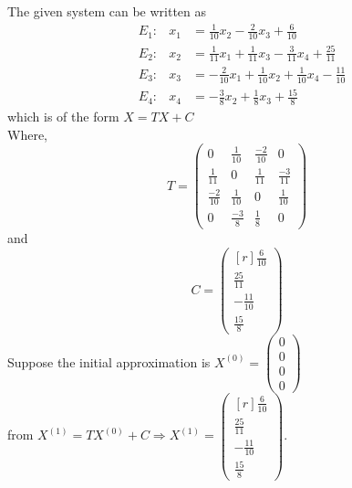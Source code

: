 \documentclass[12pt,class=book,crop=false]{standalone}
\begin{document}
    \begin{soln}
        The given system can be written as
        \[
            \begin{aligned}
                &E_1:&x_1&= \frac{1}{10}x_2-\frac{2}{10}x_3+\frac{6}{10}\\
                &E_2:&x_2&= \frac{1}{11}x_1+\frac{1}{11}x_3-\frac{3}{11}x_4+\frac{25}{11}\\
                &E_3:&x_3&= -\frac{2}{10}x_1+\frac{1}{10}x_2+\frac{1}{10}x_4-\frac{11}{10}\\
                &E_4:&x_4&= -\frac{3}{8}x_2+\frac{1}{8}x_3+\frac{15}{8}
            \end{aligned}
        \]
        which is of the form \( X=TX+C \)\\
        Where,
        \[
            T=\begin{pmatrix}
                0&\frac{1}{10}&\frac{-2}{10}&0\\[.5cm]
                \frac{1}{11}&0&\frac{1}{11}&\frac{-3}{11}\\[.5cm]
                \frac{-2}{10}&\frac{1}{10}&0&\frac{1}{10}\\[.5cm]
                0&\frac{-3}{8}&\frac{1}{8}&0
            \end{pmatrix}
        \]
        and 
        \[
            C=\begin{pmatrix*}[r]
                \frac{6}{10}\\[.5cm]
                \frac{25}{11}\\[.5cm]
                -\frac{11}{10}\\[.5cm]
                \frac{15}{8}
            \end{pmatrix*}
        \]
        Suppose the initial approximation is \( X^{(0)}=\begin{pmatrix}
            0\\
            0\\
            0\\
            0
        \end{pmatrix} \)\\
        from \( X^{(1)}=TX^{(0)}+C\Rightarrow X^{(1)}=
        \begin{pmatrix*}[r]
            \frac{6}{10}\\[0.5cm]
            \frac{25}{11}\\[0.5cm]
            -\frac{11}{10}\\[0.5cm]
            \frac{15}{8}
        \end{pmatrix*} \).\\

\end{soln}
\end{document}
